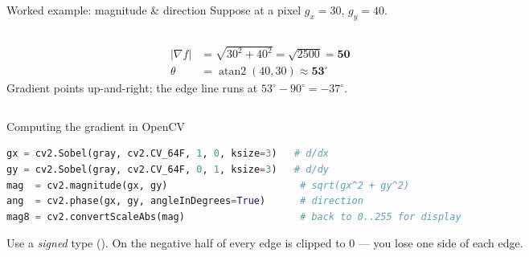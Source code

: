 \documentclass[10pt,aspectratio=169]{beamer}
\begin{document}
\begin{frame}{Worked example: magnitude \& direction}
  Suppose at a pixel $g_x = 30$, $g_y = 40$.
  \begin{columns}[T]
    \begin{column}{0.55\textwidth}
      \begin{align*}
        |\nabla f| &= \sqrt{30^2 + 40^2} = \sqrt{2500} = \mathbf{50}\\[2pt]
        \theta     &= \operatorname{atan2}(40,30) \approx \mathbf{53^\circ}
      \end{align*}
      Gradient points up-and-right; the edge line runs at $53^\circ-90^\circ = -37^\circ$.
    \end{column}
    \begin{column}{0.45\textwidth}
    \end{column}
  \end{columns}
\end{frame}

\begin{frame}[fragile]{Computing the gradient in OpenCV}
\begin{lstlisting}[language=Python]
gx = cv2.Sobel(gray, cv2.CV_64F, 1, 0, ksize=3)   # d/dx
gy = cv2.Sobel(gray, cv2.CV_64F, 0, 1, ksize=3)   # d/dy
mag  = cv2.magnitude(gx, gy)                       # sqrt(gx^2 + gy^2)
ang  = cv2.phase(gx, gy, angleInDegrees=True)      # direction
mag8 = cv2.convertScaleAbs(mag)                    # back to 0..255 for display
\end{lstlisting}
  \begin{badbox}
    Use a \emph{signed} type (). On  the negative half of every edge is
    clipped to 0 — you lose one side of each edge.
  \end{badbox}
\end{frame}
\end{document}
